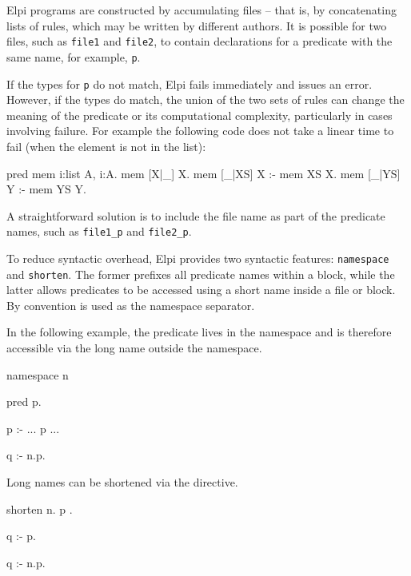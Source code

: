 \documentclass{these-ISSS}
\newenvironment{elpicode}
  {\VerbatimEnvironment\begin{elpibox}\begin{xelpicode}}{\end{xelpicode}
\end{elpibox}}
\begin{document}
Elpi programs are constructed by accumulating files -- that is, by concatenating lists
of rules, which may be written by different authors. It is possible for two
files, such as \texttt{file1} and \texttt{file2}, to contain declarations for a
predicate with the same name, for example, \texttt{p}.

If the types for \texttt{p} do not match, Elpi fails immediately and issues an
error. However, if the types do match, the union of the two sets of
rules can change the meaning of the predicate or its computational complexity,
particularly in cases involving failure. For example the following code
does not take a linear time to fail (when the element is not in the list):

\begin{elpicode}
pred mem i:list A, i:A.    %
mem [X|_] X.               %
mem [_|XS] X :- mem XS X.  %
mem [_|YS] Y :- mem YS Y.  %
\end{elpicode}

A straightforward solution is to include the file name as part of the predicate
names, such as \texttt{file1\_p} and \texttt{file2\_p}.

To reduce syntactic overhead, Elpi provides two syntactic features:
\texttt{namespace} and \texttt{shorten}. The former prefixes all predicate
names within a block, while the latter allows predicates to be accessed using a
short name inside a file or block. By convention  is used as
the namespace separator.

In the following example, the predicate  lives in the namespace
 and is therefore accessible via the long name  outside the
namespace.

\begin{elpicode}
namespace n {

  pred p.

  p :- ... p ...

}

q :- n.p.
\end{elpicode}

\noindent
Long names can be shortened via the  directive.

\begin{elpicode}
shorten n.{ p }.

q :- p.

q :- n.p.
\end{elpicode}
\end{document}
